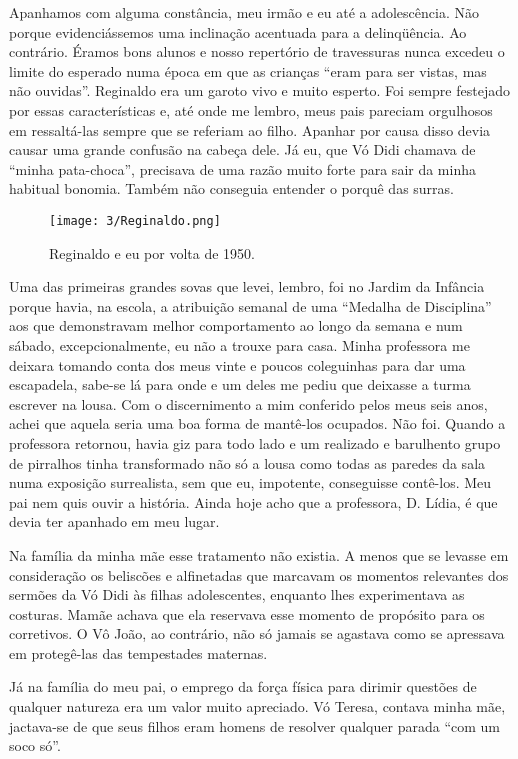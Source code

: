 Apanhamos com alguma constância, meu irmão e eu até a adolescência. 
Não porque evidenciássemos uma inclinação acentuada para a delinqüência. 
Ao contrário. 
Éramos bons alunos e nosso repertório de travessuras nunca excedeu o limite do esperado numa época em que as crianças ``eram para ser vistas, mas não ouvidas''. 
Reginaldo era um garoto vivo e muito esperto. 
Foi sempre festejado por essas características e, até onde me lembro, meus pais pareciam orgulhosos em ressaltá-las sempre que se referiam ao filho. 
Apanhar por causa disso devia causar uma grande confusão na cabeça dele. Já eu, que Vó Didi chamava de ``minha pata-choca'', precisava de uma razão muito forte para sair da minha habitual bonomia. 
Também não conseguia entender o porquê das surras.

\begin{figure}[H]
\centering
\texttt{[image: 3/Reginaldo.png]}
\caption{Reginaldo e eu por volta de 1950.}
\end{figure}

Uma das primeiras grandes sovas que levei, lembro, foi no Jardim da Infância porque havia, na escola, a atribuição semanal de uma ``Medalha de Disciplina'' aos que demonstravam melhor comportamento ao longo da semana e num sábado, excepcionalmente, eu não a trouxe para casa. 
Minha professora me deixara tomando conta dos meus vinte e poucos coleguinhas para dar uma escapadela, sabe-se lá para onde e um deles me pediu que deixasse a turma escrever na lousa. 
Com o discernimento a mim conferido pelos meus seis anos, achei que aquela seria uma boa forma de mantê-los ocupados. 
Não foi. 
Quando a professora retornou, havia giz para todo lado e um realizado e barulhento grupo de pirralhos tinha transformado não só a lousa como todas as paredes da sala numa exposição surrealista, sem que eu, impotente, conseguisse contê-los. 
Meu pai nem quis ouvir a história. 
Ainda hoje acho que a professora, D. Lídia, é que devia ter apanhado em meu lugar. 
 
Na família da minha mãe esse tratamento não existia. 
A menos que se levasse em consideração os beliscões e alfinetadas que marcavam os momentos relevantes dos sermões da Vó Didi às filhas adolescentes, enquanto lhes experimentava as costuras. 
Mamãe achava que ela reservava esse momento de propósito para os corretivos. O
Vô João, ao contrário, não só jamais se agastava como se apressava em protegê-las das tempestades maternas. 

Já na família do meu pai, o emprego da força física para dirimir questões de qualquer natureza era um valor muito apreciado. 
Vó Teresa, contava minha mãe, jactava-se de que seus filhos eram homens de resolver qualquer parada ``com um soco só''. 

